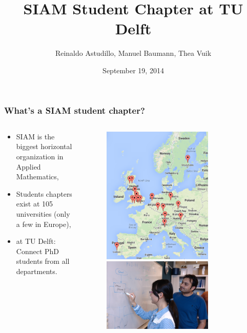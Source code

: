 \documentclass{beamer}
\title{\huge{SIAM Student Chapter at TU Delft}}
\author{Reinaldo Astudillo, Manuel Baumann, Thea Vuik}
\date{\footnotesize{September 19, 2014}}
\begin{document}
\frame{\titlepage}
\begin{frame}
\frametitle{What's a SIAM student chapter?}
\begin{columns}
 \begin{column}{0.7\textwidth}
 \begin{itemize}
  \item SIAM is the biggest horizontal organization in Applied Mathematics,
  \item Students chapters exist at 105 universities (only a few in Europe),
  \item at TU Delft: Connect PhD students from all departments.
 \end{itemize}

 \end{column}

 \begin{column}{0.4\textwidth}
  \begin{figure}[t]
  \centering
  \includegraphics[width=0.75\textwidth]{images/map} \vspace{0.6cm}\\
  \includegraphics[width=0.75\textwidth]{images/whiteboard1}
  \end{figure}
 \end{column}
 \end{columns}
\end{frame}
\end{document}
